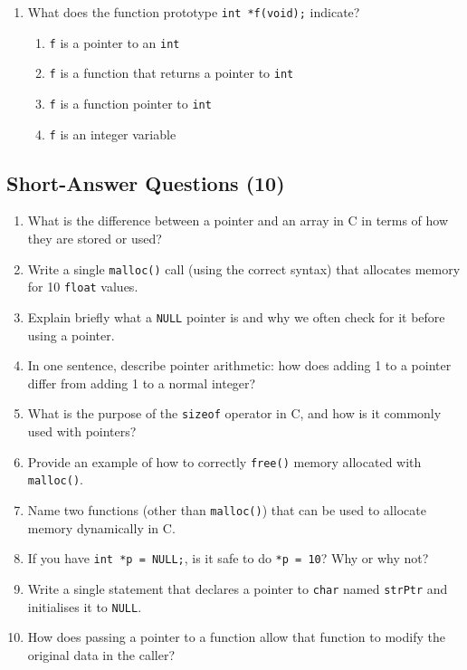 \documentclass[a4paper,12pt]{article}
\begin{document}
\begin{enumerate}
  \item What does the function prototype \texttt{int *f(void);} indicate?
  \begin{enumerate}[label=(\alph*)]
    \item \texttt{f} is a pointer to an \texttt{int}
    \item \texttt{f} is a function that returns a pointer to \texttt{int}
    \item \texttt{f} is a function pointer to \texttt{int}
    \item \texttt{f} is an integer variable
  \end{enumerate}

\end{enumerate}

\hrulefill

\newpage

\subsection{Short-Answer Questions (10)}

\begin{enumerate}
  \item What is the difference between a pointer and an array in C in terms of how they are stored or used?

  \item Write a single \texttt{malloc()} call (using the correct syntax) that allocates memory for 10 \texttt{float} values.

  \item Explain briefly what a \texttt{NULL} pointer is and why we often check for it before using a pointer.

  \item In one sentence, describe pointer arithmetic: how does adding 1 to a pointer differ from adding 1 to a normal integer?

  \item What is the purpose of the \texttt{sizeof} operator in C, and how is it commonly used with pointers?

  \item Provide an example of how to correctly \texttt{free()} memory allocated with \texttt{malloc()}.

  \item Name two functions (other than \texttt{malloc()}) that can be used to allocate memory dynamically in C.

  \item If you have \texttt{int *p = NULL;}, is it safe to do \texttt{*p = 10}? Why or why not?

  \item Write a single statement that declares a pointer to \texttt{char} named \texttt{strPtr} and initialises it to \texttt{NULL}.

  \item How does passing a pointer to a function allow that function to modify the original data in the caller?
\end{enumerate}
\end{document}
